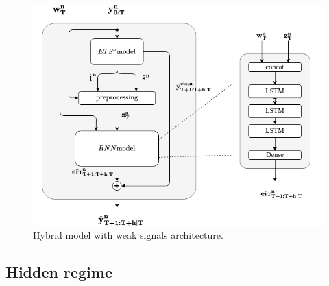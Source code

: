 \documentclass{article} %
\begin{document}
\begin{figure}
  \centering
    \includegraphics[width=0.8\linewidth]{figure/hybrid_model_archi.png}
  \caption{Hybrid model with weak signals architecture.}
\label{fig:architecture}
\end{figure}


\subsection{Hidden regime}
\end{document}
